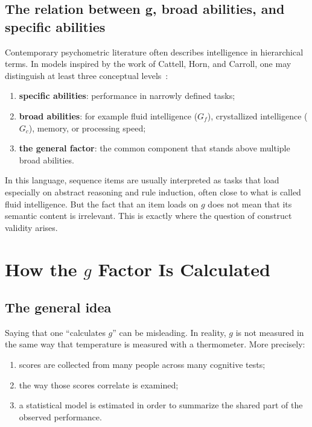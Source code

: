 \documentclass[10pt, a4paper]{article}
\theoremstyle{plain}
\theoremstyle{definition}
\theoremstyle{remark}
\begin{document}
\subsection{The relation between g, broad abilities, and specific abilities}

Contemporary psychometric literature often describes intelligence in hierarchical
terms. In models inspired by the work of Cattell, Horn, and Carroll, one may
distinguish at least three conceptual levels~\cite{cattell1963, carroll1993}:
\begin{enumerate}[label=\arabic*.]
    \item \textbf{specific abilities}: performance in narrowly defined tasks;
    \item \textbf{broad abilities}: for example fluid intelligence ($G_f$),
          crystallized intelligence ($G_c$), memory, or processing speed;
    \item \textbf{the general factor}: the common component that stands above
          multiple broad abilities.
\end{enumerate}

In this language, sequence items are usually interpreted as tasks that load
especially on abstract reasoning and rule induction, often close to what is
called fluid intelligence. But the fact that an item loads on $g$ does not mean
that its semantic content is irrelevant. This is exactly where the question of
construct validity arises.

\section{How the \texorpdfstring{$g$}{g} Factor Is Calculated}
\label{sec:gcalc}

\subsection{The general idea}

Saying that one ``calculates $g$'' can be misleading. In reality, $g$ is not
measured in the same way that temperature is measured with a thermometer. More
precisely:
\begin{enumerate}[label=\arabic*.]
    \item scores are collected from many people across many cognitive tests;
    \item the way those scores correlate is examined;
    \item a statistical model is estimated in order to summarize the shared part
          of the observed performance.
\end{enumerate}
\end{document}
